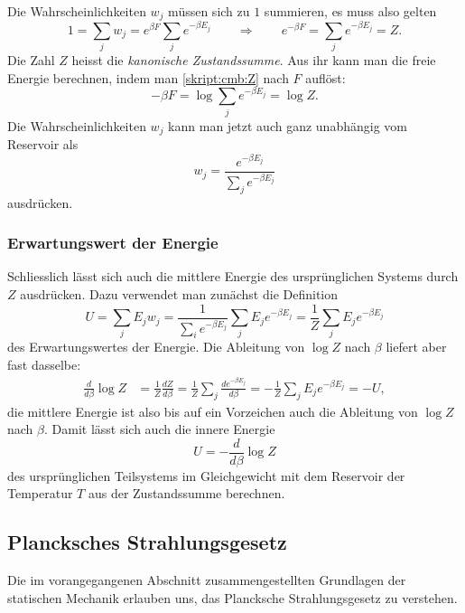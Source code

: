Die Wahrscheinlichkeiten $w_j$ müssen sich zu $1$ summieren, es muss also
gelten
\begin{equation}
1=\sum_{j} w_j = e^{\beta F}\sum_j e^{-\beta E_j}
\qquad
\Rightarrow
\qquad
e^{-\beta F}=\sum_je^{-\beta E_j}=Z.
\label{skript:cmb:Z}
\end{equation}
Die Zahl $Z$ heisst die {\em kanonische Zustandssumme}.
%
%
Aus ihr kann man die freie Energie berechnen, indem man
\eqref{skript:cmb:Z} nach $F$ auflöst:
\begin{equation}
-\beta F=\log\sum_j e^{-\beta E_j} = \log Z.
\end{equation}
Die Wahrscheinlichkeiten $w_j$ kann man jetzt auch ganz unabhängig vom
Reservoir als
\begin{equation}
w_j
=
\frac{e^{-\beta E_j}}{\sum_j e^{-\beta E_j}}
\end{equation}
ausdrücken.

\subsubsection{Erwartungswert der Energie}
Schliesslich lässt sich auch die mittlere Energie des ursprünglichen
Systems durch $Z$ ausdrücken.
Dazu verwendet man zunächst die Definition 
\[
U
=
\sum_j E_jw_j
=
\frac{1}{\sum_i e^{-\beta E_j}}
\sum_j E_je^{-\beta E_j}
=
\frac1Z \sum_j E_je^{-\beta E_j}
\]
des Erwartungswertes der Energie.
Die Ableitung von $\log Z$ nach $\beta$ liefert aber fast dasselbe:
\begin{align*}
\frac{d}{d\beta} \log Z
&=
\frac1{Z}\frac{dZ}{d\beta}
=
\frac1{Z}\sum_j\frac{de^{-\beta E_j}}{d\beta}
=
-\frac1Z\sum_j E_je^{-\beta E_j}
=
-U,
\end{align*}
die mittlere Energie ist also bis auf ein Vorzeichen auch die Ableitung
von $\log Z$ nach $\beta$.
Damit lässt sich auch die innere Energie
\[
U=-\frac{d}{d\beta}\log Z
\]
des ursprünglichen Teilsystems im Gleichgewicht mit dem Reservoir der
Temperatur $T$ aus der Zustandssumme berechnen.

\subsection{Plancksches Strahlungsgesetz%
\label{skript:cmb:section:planck}}
Die im vorangegangenen Abschnitt zusammengestellten Grundlagen der
statischen Mechanik erlauben uns, das Plancksche Strahlungsgesetz
zu verstehen.
%
%

